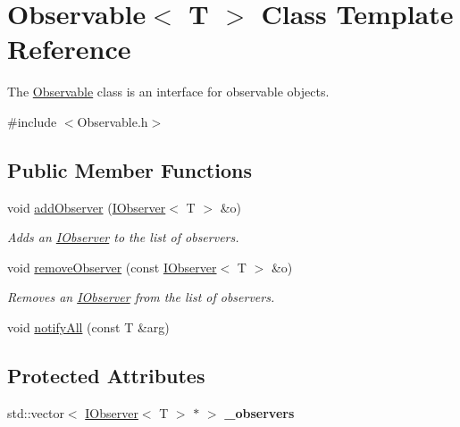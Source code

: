 \hypertarget{class_observable}{}\section{Observable$<$ T $>$ Class Template Reference}
\label{class_observable}


The \hyperlink{class_observable}{Observable} class is an interface for observable objects.  




{\ttfamily \#include $<$Observable.\+h$>$}

\subsection*{Public Member Functions}
\begin{DoxyCompactItemize}
\item 
void \hyperlink{class_observable_a5caccd0c60c6e11843be0ee0197d34e1}{add\+Observer} (\hyperlink{struct_i_observer}{I\+Observer}$<$ T $>$ \&o)\hypertarget{class_observable_a5caccd0c60c6e11843be0ee0197d34e1}{}\label{class_observable_a5caccd0c60c6e11843be0ee0197d34e1}

\begin{DoxyCompactList}\small\item\em Adds an \hyperlink{struct_i_observer}{I\+Observer} to the list of observers. \end{DoxyCompactList}\item 
void \hyperlink{class_observable_a88784c910caefa3a830025209d71adb3}{remove\+Observer} (const \hyperlink{struct_i_observer}{I\+Observer}$<$ T $>$ \&o)\hypertarget{class_observable_a88784c910caefa3a830025209d71adb3}{}\label{class_observable_a88784c910caefa3a830025209d71adb3}

\begin{DoxyCompactList}\small\item\em Removes an \hyperlink{struct_i_observer}{I\+Observer} from the list of observers. \end{DoxyCompactList}\item 
void \hyperlink{class_observable_a2f2f224a73edbb6d42f6534ba0d28602}{notify\+All} (const T \&arg)
\end{DoxyCompactItemize}
\subsection*{Protected Attributes}
\begin{DoxyCompactItemize}
\item 
std\+::vector$<$ \hyperlink{struct_i_observer}{I\+Observer}$<$ T $>$ $\ast$ $>$ {\bfseries \+\_\+observers}\hypertarget{class_observable_a21f00b2d8f33fafe8aaa2360998d1d62}{}\label{class_observable_a21f00b2d8f33fafe8aaa2360998d1d62}

\end{DoxyCompactItemize}


